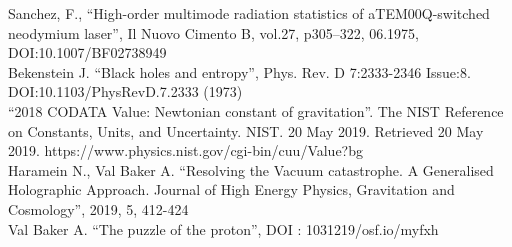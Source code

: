 \documentclass[a4paper,9pt]{article}
\begin{document}
\begin{thebibliography}{99}
 Sanchez, F., ``High-order multimode radiation statistics of aTEM00Q-switched neodymium laser'', Il Nuovo Cimento B, vol.27, p305--322, 06.1975, DOI:10.1007/BF02738949 \\

 Bekenstein J. ``Black holes and entropy'', Phys. Rev. D 7:2333-2346 Issue:8. DOI:10.1103/PhysRevD.7.2333 (1973) \\

 ``2018 CODATA Value: Newtonian constant of gravitation''. The NIST Reference on Constants, Units, and Uncertainty. NIST. 20 May 2019. Retrieved 20 May 2019. https://www.physics.nist.gov/cgi-bin/cuu/Value?bg \\


 Haramein N., Val Baker A. ``Resolving the Vacuum catastrophe. A Generalised Holographic Approach. Journal of High Energy Physics, Gravitation and Cosmology'', 2019, 5, 412-424 \\ 

 Val Baker A. ``The puzzle of the proton'', DOI : 1031219/osf.io/myfxh \\

\end{thebibliography}
\end{document}
